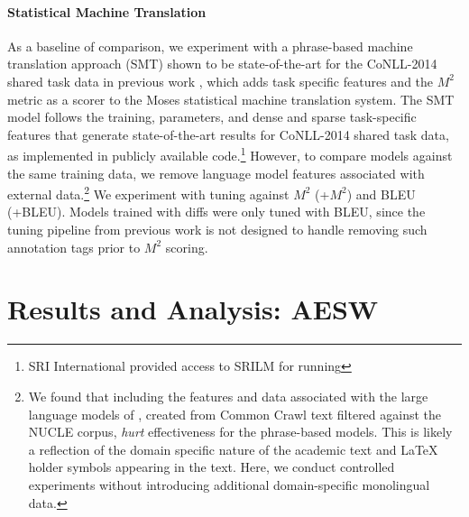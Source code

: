 \documentclass[11pt,letterpaper]{article}
\begin{document}
\paragraph{Statistical Machine Translation}
 As a baseline of comparison, we experiment with a phrase-based machine translation approach (\textsc{SMT}) shown to be state-of-the-art for the CoNLL-2014 shared task data in previous work \cite{junczysdowmunt-grundkiewicz:2016:EMNLP2016}, which adds task specific features and the $M^2$ metric as a scorer to the Moses statistical machine translation system. The \textsc{SMT} model follows the training, parameters, and dense and sparse task-specific features that generate state-of-the-art results for CoNLL-2014 shared task data, as implemented in publicly available code.\footnote{SRI International provided access to SRILM \cite{Stolcke02srilm} for running } However, to compare models against the same training data, we remove language model features associated with external data.\footnote{We found that including the features and data associated with the large language models of , created from Common Crawl text filtered against the NUCLE corpus, \textit{hurt} effectiveness for the phrase-based models. This is likely a reflection of the domain specific nature of the academic text and LaTeX holder symbols appearing in the text. Here, we conduct controlled experiments without introducing additional domain-specific monolingual data.} We experiment with tuning against $M^2$ (\textsc{+$M^2$}) and BLEU (\textsc{+BLEU}). Models trained with diffs were only tuned with BLEU, since the tuning pipeline from previous work is not designed to handle removing such annotation tags prior to $M^2$ scoring. 

\section{Results and Analysis: AESW}
\end{document}
